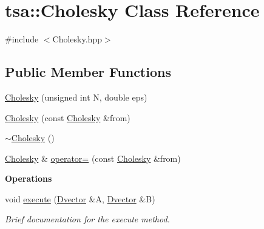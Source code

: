 \hypertarget{classtsa_1_1_cholesky}{}\section{tsa\+:\+:Cholesky Class Reference}
\label{classtsa_1_1_cholesky}


{\ttfamily \#include $<$Cholesky.\+hpp$>$}

\subsection*{Public Member Functions}
\begin{DoxyCompactItemize}
\item 
\hyperlink{classtsa_1_1_cholesky_a19dfa3cb6bf14721a91ec6fdcb26dbcf}{Cholesky} (unsigned int N, double eps)
\item 
\hyperlink{classtsa_1_1_cholesky_a86a264d92076daba27859959741b3627}{Cholesky} (const \hyperlink{classtsa_1_1_cholesky}{Cholesky} \&from)
\item 
\hyperlink{classtsa_1_1_cholesky_a45d30ca313f3949504716bacb5036b6d}{$\sim$\+Cholesky} ()
\item 
\hyperlink{classtsa_1_1_cholesky}{Cholesky} \& \hyperlink{classtsa_1_1_cholesky_a3c86b3ab61a3dd759b067ce685e6f51e}{operator=} (const \hyperlink{classtsa_1_1_cholesky}{Cholesky} \&from)
\end{DoxyCompactItemize}
\begin{Indent}\textbf{ Operations}\par
\begin{DoxyCompactItemize}
\item 
void \hyperlink{classtsa_1_1_cholesky_ac04746ca67f2fb532dc060a35a1ba4d8}{execute} (\hyperlink{namespacetsa_a8900fb03d849baf447a1a0efe2561fb2}{Dvector} \&A, \hyperlink{namespacetsa_a8900fb03d849baf447a1a0efe2561fb2}{Dvector} \&B)
\begin{DoxyCompactList}\small\item\em Brief documentation for the execute method. \end{DoxyCompactList}\end{DoxyCompactItemize}
\end{Indent}
